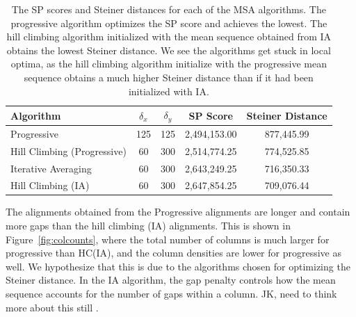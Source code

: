 \documentclass{article}
\begin{document}
\begin{table}
\centering
\begin{tabular}[h]{|l|c|c|c|c|}
\hline
\bf{Algorithm}              & $\delta_x$ & $\delta_y$ & \bf{SP Score} & \bf{Steiner Distance}\\
\hline
Progressive                 & 125        & 125        & 2,494,153.00  & 877,445.99 \\
Hill Climbing (Progressive) & 60         & 300        & 2,514,774.25  & 774,525.85\\
Iterative Averaging         & 60         & 300        & 2,643,249.25  & 716,350.33\\
Hill Climbing (IA)          & 60         & 300        & 2,647,854.25  & 709,076.44\\
\hline
\end{tabular}
\caption{
\label{tbl:sp_steiner}
The SP scores and Steiner distances for each of the MSA algorithms.
The progressive algorithm optimizes the SP score and achieves the lowest.
The hill climbing algorithm initialized with the mean sequence obtained from IA
obtains the lowest Steiner distance.
We see the algorithms get stuck in local optima, as the hill climbing algorithm
initialize with the progressive mean sequence obtains a much higher
Steiner distance than if it had been initialized with IA.
}
\end{table}

The alignments obtained from the Progressive alignments are longer and contain more gaps
than the hill climbing (IA) alignments.
This is shown in Figure~\ref{fig:colcounts},
where the total number of columns is much larger for progressive than HC(IA),
and the column densities are lower for progressive as well.
We hypothesize that this is due to the algorithms chosen for optimizing the Steiner distance.
In the IA algorithm, the gap penalty controls how the 
mean sequence accounts for the number of gaps within a column.
JK, need to think more about this still \citep{lei2004triangle}.
\end{document}
